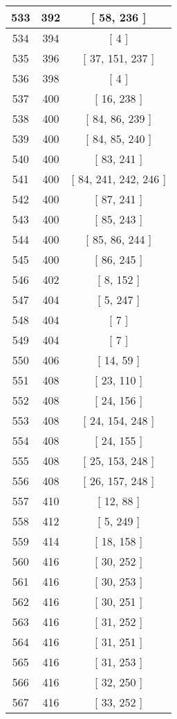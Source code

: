 \begin{center}
\begin{longtable}[H]{|| c c c ||}
\hline
533 & 392 & [ 58, 236 ] \\ 
\hline
534 & 394 & [ 4 ] \\ 
\hline
535 & 396 & [ 37, 151, 237 ] \\ 
\hline
536 & 398 & [ 4 ] \\ 
\hline
537 & 400 & [ 16, 238 ] \\ 
\hline
538 & 400 & [ 84, 86, 239 ] \\ 
\hline
539 & 400 & [ 84, 85, 240 ] \\ 
\hline
540 & 400 & [ 83, 241 ] \\ 
\hline
541 & 400 & [ 84, 241, 242, 246 ] \\ 
\hline
542 & 400 & [ 87, 241 ] \\ 
\hline
543 & 400 & [ 85, 243 ] \\ 
\hline
544 & 400 & [ 85, 86, 244 ] \\ 
\hline
545 & 400 & [ 86, 245 ] \\ 
\hline
546 & 402 & [ 8, 152 ] \\ 
\hline
547 & 404 & [ 5, 247 ] \\ 
\hline
548 & 404 & [ 7 ] \\ 
\hline
549 & 404 & [ 7 ] \\ 
\hline
550 & 406 & [ 14, 59 ] \\ 
\hline
551 & 408 & [ 23, 110 ] \\ 
\hline
552 & 408 & [ 24, 156 ] \\ 
\hline
553 & 408 & [ 24, 154, 248 ] \\ 
\hline
554 & 408 & [ 24, 155 ] \\ 
\hline
555 & 408 & [ 25, 153, 248 ] \\ 
\hline
556 & 408 & [ 26, 157, 248 ] \\ 
\hline
557 & 410 & [ 12, 88 ] \\ 
\hline
558 & 412 & [ 5, 249 ] \\ 
\hline
559 & 414 & [ 18, 158 ] \\ 
\hline
560 & 416 & [ 30, 252 ] \\ 
\hline
561 & 416 & [ 30, 253 ] \\ 
\hline
562 & 416 & [ 30, 251 ] \\ 
\hline
563 & 416 & [ 31, 252 ] \\ 
\hline
564 & 416 & [ 31, 251 ] \\ 
\hline
565 & 416 & [ 31, 253 ] \\ 
\hline
566 & 416 & [ 32, 250 ] \\ 
\hline
567 & 416 & [ 33, 252 ] \\ 

\end{longtable}
\end{center}
